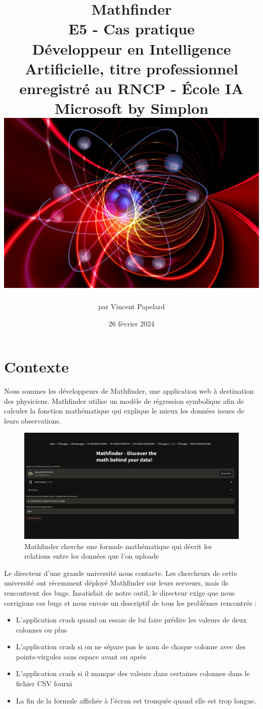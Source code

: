 \documentclass[french]{article}
\title{%
    \huge Mathfinder  \\
    \bigskip
    \large E5 - Cas pratique \\ 
    Développeur en Intelligence Artificielle,
    titre professionnel enregistré au RNCP - École IA Microsoft by Simplon
    \vfill
    \includegraphics[width=14cm]{physics.jpg} %
    \vfill}
\date{26 février 2024}
\author{par Vincent Papelard}
\begin{document}
    \maketitle
    \newpage
    \newpage

    \section{Contexte}
    Nous sommes les développeurs de Mathfinder, une application web à destination des physiciens. Mathfinder utilise un modèle de régression symbolique afin de calculer la fonction mathématique qui explique le mieux les données issues de leurs observations.

    \begin{figure}[h]
        \includegraphics[width=12cm]{appli}
        \centering
        \caption{Mathfinder cherche une formule mathématique qui décrit les relations entre les données que l'on uploade}
        \centering
    \end{figure}

    Le directeur d'une grande université nous contacte. Les chercheurs de cette université ont récemment déployé Mathfinder sur leurs serveurs, mais ils rencontrent des bugs. Insatisfait de notre outil, le directeur exige que nous corrigions ces bugs et nous envoie un descriptif de tous les problèmes rencontrés :
    \begin{itemize}
        \item L'application crash quand on essaie de lui faire prédire les valeurs de deux colonnes ou plus
        \item L'application crash si on ne sépare pas le nom de chaque colonne avec des points-virgules sans espace avant ou après
        \item L'application crash si il manque des valeurs dans certaines colonnes dans le fichier CSV fourni
        \item La fin de la formule affichée à l'écran est tronquée quand elle est trop longue.
    \end{itemize}
\end{document}
